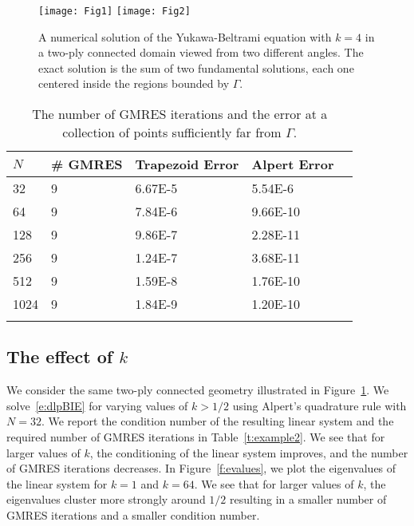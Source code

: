 \begin{figure}[htps]
  \texttt{[image: Fig1]}
  \texttt{[image: Fig2]}
\caption{\label{f:twoply} A numerical solution of the Yukawa-Beltrami
equation with $k=4$ in a two-ply connected domain viewed from two
different angles.  The exact solution is the sum of two fundamental
solutions, each one centered inside the regions bounded by $\Gamma$.}
\end{figure}

\begin{table}[htps]
\caption{\label{t:example1} The number of GMRES iterations and the
error at a collection of points sufficiently far from $\Gamma$.}
\centering
\begin{tabular*}{0.8\textwidth}{@{\extracolsep{\fill}}lllll}
$N$ & \# GMRES & Trapezoid Error & Alpert Error  \\
\hline\noalign{\smallskip}
32   & 9 & 6.67E-5 & 5.54E-6  \\
64   & 9 & 7.84E-6 & 9.66E-10 \\
128  & 9 & 9.86E-7 & 2.28E-11 \\
256  & 9 & 1.24E-7 & 3.68E-11 \\
512  & 9 & 1.59E-8 & 1.76E-10 \\  
1024 & 9 & 1.84E-9 & 1.20E-10 \\ 
\noalign{\smallskip}\hline
\end{tabular*}
\end{table}

\subsection{The effect of $k$}
We consider the same two-ply connected geometry illustrated in
Figure~\ref{f:twoply}.  We solve~\eqref{e:dlpBIE} for varying values of
$k > 1/2$ using Alpert's quadrature rule with $N=32$.  We report the
condition number of the resulting linear system and the required number
of GMRES iterations in Table~\ref{t:example2}.  We see that for larger
values of $k$, the conditioning of the linear system improves, and the
number of GMRES iterations decreases.  In Figure~\ref{f:evalues}, we
plot the eigenvalues of the linear system for $k=1$ and $k=64$.  We see
that for larger values of $k$, the eigenvalues cluster more strongly
around $1/2$ resulting in a smaller number of GMRES iterations and a
smaller condition number.


